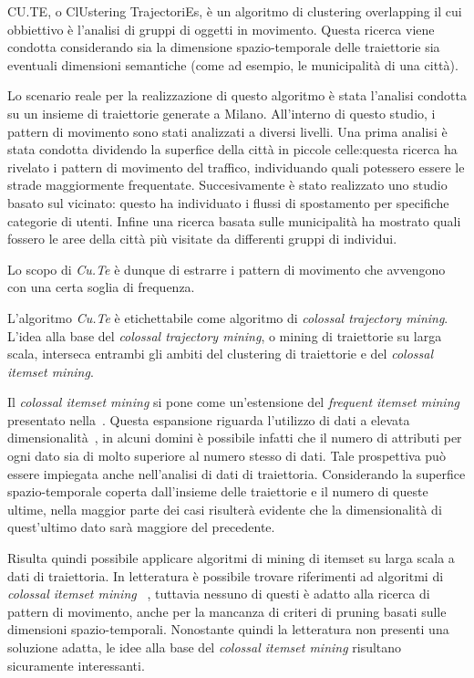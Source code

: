 CU.TE, o ClUstering TrajectoriEs, è un algoritmo di clustering overlapping il cui obbiettivo è l'analisi
di gruppi di oggetti in movimento. Questa ricerca viene condotta considerando sia la dimensione spazio-temporale
delle traiettorie sia eventuali dimensioni semantiche (come ad esempio, le municipalità di una città).

Lo scenario reale per la realizzazione di questo algoritmo è stata l'analisi condotta su
un insieme di traiettorie generate a Milano. All'interno di questo studio, i pattern di movimento sono
stati analizzati a diversi livelli.
Una prima analisi è stata condotta dividendo la superfice della città in piccole celle:questa ricerca
ha rivelato i pattern di movimento del traffico, individuando quali potessero essere le strade
maggiormente frequentate.
Succesivamente è stato realizzato uno studio basato sul vicinato: questo ha individuato i flussi di spostamento per specifiche categorie di utenti.
Infine una ricerca basata sulle municipalità ha mostrato quali fossero le aree della città più visitate da differenti gruppi di individui.

Lo scopo di \textit{Cu.Te} è dunque di estrarre i pattern di movimento che avvengono con una certa soglia di frequenza.

L'algoritmo \textit{Cu.Te} è etichettabile come algoritmo di \textit{colossal trajectory mining}.
L'idea alla base del \textit{colossal trajectory mining},
o mining di traiettorie su larga scala, interseca entrambi gli ambiti del clustering di traiettorie
e del \textit{colossal itemset mining}.


Il \textit{colossal itemset mining} si pone come un'estensione del \textit{frequent itemset mining}
presentato nella~. Questa espansione riguarda l'utilizzo di dati
a elevata dimensionalità~\cite{zhu2007mining}, in alcuni domini è possibile infatti che il numero di attributi per ogni dato sia di molto superiore al numero stesso di dati.
Tale prospettiva può essere impiegata anche nell'analisi di dati di traiettoria. Considerando la superfice
spazio-temporale coperta dall'insieme delle traiettorie e il numero di queste ultime, nella maggior parte dei casi risulterà evidente
che la dimensionalità di quest'ultimo dato sarà maggiore del precedente.

Risulta quindi possibile applicare algoritmi di mining di itemset su larga scala a dati di traiettoria.
In letteratura è possibile trovare riferimenti ad algoritmi di \textit{colossal itemset mining}~\cite{DBLP:journals/bdr/ApilettiBCGPM17, DBLP:conf/kdd/PanCTYZ03}
, tuttavia nessuno di questi è adatto alla ricerca di pattern di movimento, anche per la mancanza di
criteri di pruning basati sulle dimensioni spazio-temporali. Nonostante quindi la letteratura non
presenti una soluzione adatta, le idee alla base del \textit{colossal itemset mining} risultano sicuramente interessanti.

